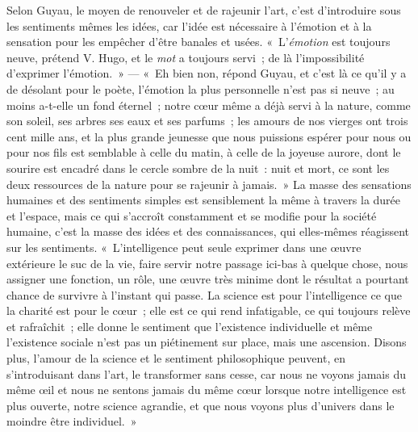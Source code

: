 \documentclass[french,twoside]{book} %
\begin{document}
Selon Guyau, le moyen de renouveler et de rajeunir l’art, c’est d’introduire sous les sentiments mêmes les idées, car l’idée est nécessaire à l’émotion et à la sensation pour les empêcher d’être banales et usées. « L’\emph{émotion} est toujours neuve, prétend V. Hugo, et le \emph{mot} a toujours servi ; de là l’impossibilité d’exprimer l’émotion. » — « Eh bien non, répond Guyau, et c’est là ce qu’il y a de désolant pour le poète, l’émotion la plus personnelle n’est pas si neuve ; au moins a-t-elle un fond éternel ; notre cœur même a déjà servi à la nature, comme son soleil, ses arbres ses eaux et ses parfums ; les amours de nos vierges ont trois cent mille ans, et la plus grande jeunesse que nous puissions espérer pour nous ou pour nos fils est semblable à celle du matin, à celle de la joyeuse aurore, dont le sourire est encadré dans le cercle sombre de la nuit : nuit et mort, ce sont les deux ressources de la nature pour se rajeunir à jamais. » La masse des sensations humaines et des sentiments simples est sensiblement la même à travers la durée et l’espace, mais ce qui s’accroît constamment et se modifie pour la société humaine, c’est la masse des idées et des connaissances, qui elles-mêmes réagissent sur les sentiments. « L’intelligence peut seule exprimer dans une œuvre extérieure le suc de la vie, faire servir notre passage ici-bas à quelque chose, nous assigner une fonction, un rôle, une œuvre très minime dont le résultat a pourtant chance de survivre à l’instant qui passe. La science est pour l’intelligence ce que la charité est pour le cœur ; elle est ce qui rend infatigable, ce qui toujours relève et rafraîchit ; elle donne le sentiment que l’existence individuelle et même l’existence sociale n’est pas un piétinement sur place, mais une ascension. Disons plus, l’amour de la science et le sentiment philosophique peuvent, en s’introduisant dans l’art, le transformer sans cesse, car nous ne voyons jamais du même œil et nous ne sentons jamais du même cœur lorsque notre intelligence est plus ouverte, notre science agrandie, et que nous voyons plus d’univers dans le moindre être individuel. »\par
\end{document}
